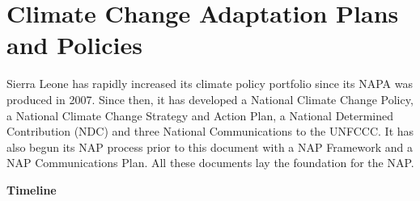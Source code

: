 \documentclass[
]{book}
\begin{document}
\hypertarget{climate-change-adaptation-plans-and-policies}{%
\section{Climate Change Adaptation Plans and Policies}\label{climate-change-adaptation-plans-and-policies}}

Sierra Leone has rapidly increased its climate policy portfolio since its NAPA was produced in 2007. Since then, it has developed a National Climate Change Policy, a National Climate Change Strategy and Action Plan, a National Determined Contribution (NDC) and three National Communications to the UNFCCC. It has also begun its NAP process prior to this document with a NAP Framework and a NAP Communications Plan. All these documents lay the foundation for the NAP.

\textbf{Timeline}

\providecommand{\docline}[3]{\noalign{\global\setlength{\arrayrulewidth}{#1}}\arrayrulecolor[HTML]{#2}\cline{#3}}

\setlength{\tabcolsep}{2pt}

\renewcommand*{\arraystretch}{1.5}
\end{document}
